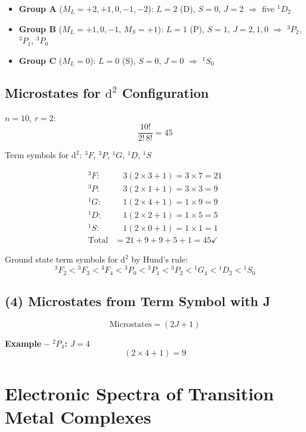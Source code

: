 \documentclass[12pt,a4paper]{article}
\begin{document}
\begin{itemize}
  \item \textbf{Group A} ($M_L = +2,+1,0,-1,-2$): $L=2$ (D), $S=0$, $J=2$ $\Rightarrow$ five ${}^1D_2$
  \item \textbf{Group B} ($M_L = +1,0,-1$, $M_S=+1$): $L=1$ (P), $S=1$, $J=2,1,0$ $\Rightarrow$ ${}^3P_2$, ${}^3P_1$, ${}^3P_0$
  \item \textbf{Group C} ($M_L=0$): $L=0$ (S), $S=0$, $J=0$ $\Rightarrow$ ${}^1S_0$
\end{itemize}

\subsection{Microstates for $\mathrm{d}^2$ Configuration}

$n = 10$, $r = 2$:
\[
\frac{10!}{2!\,8!} = 45
\]

Term symbols for $\mathrm{d}^2$: ${}^3F$, ${}^3P$, ${}^1G$, ${}^1D$, ${}^1S$

\begin{align*}
{}^3F: &\quad 3(2\times3+1) = 3\times7 = 21 \\
{}^3P: &\quad 3(2\times1+1) = 3\times3 = 9 \\
{}^1G: &\quad 1(2\times4+1) = 1\times9 = 9 \\
{}^1D: &\quad 1(2\times2+1) = 1\times5 = 5 \\
{}^1S: &\quad 1(2\times0+1) = 1\times1 = 1 \\
\text{Total} &= 21+9+9+5+1 = 45 \checkmark
\end{align*}

Ground state term symbols for $\mathrm{d}^2$ by Hund's rule:
\[
{}^3F_2 < {}^3F_3 < {}^3F_4 < {}^3P_0 < {}^3P_1 < {}^3P_2 < {}^1G_4 < {}^1D_2 < {}^1S_0
\]

\subsection{(4) Microstates from Term Symbol with J}

\[
\text{Microstates} = (2J+1)
\]

\textbf{Example -- ${}^2P_4$:} $J=4$
\[
(2\times4+1) = 9
\]

\section{Electronic Spectra of Transition Metal Complexes}
\end{document}
